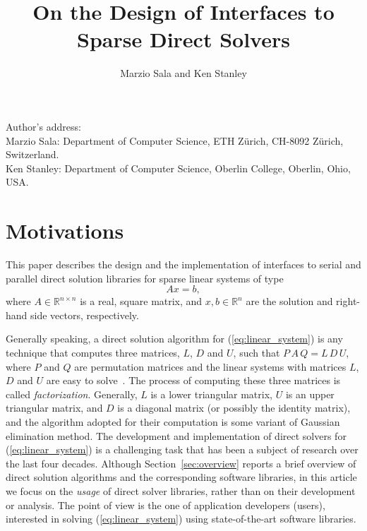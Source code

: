 \documentclass[acmtocl]{acmtrans2m}
\title{On the Design of Interfaces to Sparse Direct Solvers}
\author{Marzio Sala and Ken Stanley}
\begin{document}
\setcounter{page}{1}

\begin{bottomstuff}
Author's address:   \\
Marzio Sala: Department of Computer Science, ETH Z\"urich, CH-8092 Z\"urich,
  Switzerland. \\
Ken Stanley: Department of Computer Science, Oberlin College, Oberlin, Ohio, USA.
\end{bottomstuff}

\maketitle

\section{Motivations}
\label{sec:introduction}

This paper describes the design and the implementation of 
interfaces to serial and parallel direct solution libraries for
sparse linear systems of type
\begin{equation}
  \label{eq:linear_system}
  A x = b,
\end{equation}
where $A \in \mathbb{R}^{n \times n}$ is a real, square matrix, 
  and $x, b \in \mathbb{R}^{n}$ are the solution and
right-hand side vectors, respectively. 

Generally speaking,
a direct solution algorithm for (\ref{eq:linear_system}) is any 
technique that computes three matrices, $L$, $D$ and $U$, such that
$P\, A\, Q = L \, D \, U$, where $P$ and $Q$ are permutation matrices
and the linear systems with matrices $L$, $D$ and $U$ are
easy to solve~\cite{golub96matrix}. 
The process of computing these three matrices is called {\sl
  factorization}. Generally, $L$ is a lower triangular matrix, $U$ is an
upper triangular matrix, and $D$ is a diagonal matrix 
(or possibly the identity matrix), and the algorithm adopted for their
computation is some variant of Gaussian elimination method.
The development and implementation of
direct solvers for (\ref{eq:linear_system}) is a
challenging task that has been a subject of research over the
last four decades. Although
Section~\ref{sec:overview} reports a brief overview of direct solution algorithms and
the corresponding software libraries, in
this article we focus on the {\sl usage} of direct solver libraries, rather
than on their development or analysis. The point of view is the one
of application developers (users), interested in solving
(\ref{eq:linear_system}) using state-of-the-art software libraries.  
\end{document}

